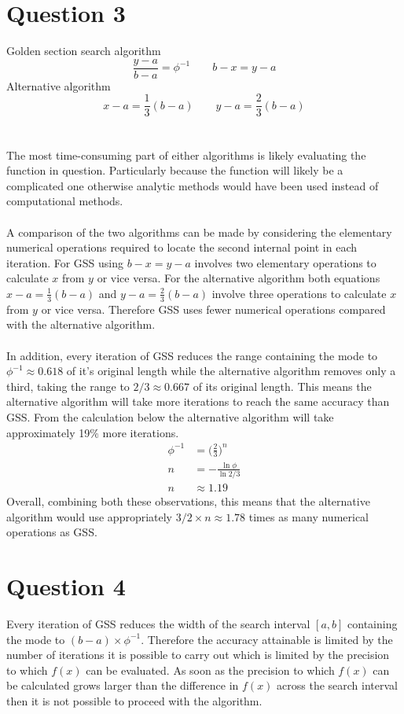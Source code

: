 \documentclass[a4paper]{article}
\begin{document}
\section*{Question 3}
Golden section search algorithm
\[ \frac{y-a}{b-a} = \phi^{-1} \qquad b-x = y-a \]
Alternative algorithm
\[ x-a=\frac{1}{3}(b-a) \qquad y-a = \frac{2}{3}(b-a) \]
\\ \\
The most time-consuming part of either algorithms is likely evaluating the function in question. Particularly because the function will likely be a complicated one otherwise analytic methods would have been used instead of computational methods.
\\ \\
A comparison of the two algorithms can be made by considering the elementary numerical operations required to locate the second internal point in each iteration. For GSS using  $b-x=y-a$  involves two elementary operations to calculate $x$ from $y$ or vice versa. For the alternative algorithm both equations  $x-a=\frac{1}{3}(b-a)$  and  $y-a = \frac{2}{3}(b-a)$  involve three operations to calculate $x$ from $y$ or vice versa. Therefore GSS uses fewer numerical operations compared with the alternative algorithm.
\\ \\
In addition, every iteration of GSS reduces the range containing the mode to $\phi^{-1} \approx 0.618$ of it's original length while the alternative algorithm removes only a third, taking the range to $2/3 \approx 0.667$ of its original length. This means the alternative algorithm will take more iterations to reach the same accuracy than GSS. From the calculation below the alternative algorithm will take approximately 19$\%$ more iterations.
\begin{align*}
\phi^{-1} &= \Big(\frac{2}{3}\Big)^n \\
n &= -\frac{\ln{\phi}}{\ln{2/3}} \\
n &\approx 1.19
\end{align*}
Overall, combining both these observations, this means that the alternative algorithm would use appropriately $3/2 \times n \approx 1.78$ times as many numerical operations as GSS. 

\section*{Question 4}
Every iteration of GSS reduces the width of the search interval  $[a,b]$  containing the mode to $(b-a)\times\phi^{-1}$. Therefore the accuracy attainable is limited by the number of iterations it is possible to carry out which is limited by the precision to which $f(x)$ can be evaluated. As soon as the precision to which $f(x)$ can be calculated grows larger than the difference in $f(x)$ across the search interval then it is not possible to proceed with the algorithm.
\end{document}
